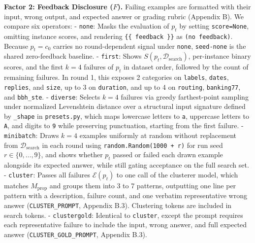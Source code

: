 \documentclass[10pt]{article}
\begin{document}
\textbf{Factor 2: Feedback Disclosure (\(F\)).} Failing examples are
formatted with their input, wrong output, and expected answer or grading
rubric (Appendix B). We compare six operators: - \texttt{none}: Masks
the evaluation of \(p_t\) by setting \texttt{score=None}, omitting
instance scores, and rendering \texttt{\{\{\ feedback\ \}\}} as
\texttt{(no\ feedback)}. Because \(p_t = c_0\) carries no
round-dependent signal under \texttt{none}, \texttt{seed-none} is the
shared zero-feedback baseline. - \texttt{first}: Shows
\(S(p_t, \mathcal{D}_{\text{search}})\), per-instance binary scores, and
the first \(k = 4\) failures of \(p_t\) in dataset order, followed by
the count of remaining failures. In round 1, this exposes 2 categories
on \texttt{labels}, \texttt{dates}, \texttt{replies}, and \texttt{size},
up to 3 on \texttt{duration}, and up to 4 on \texttt{routing},
\texttt{banking77}, and \texttt{bbh\_ste}. - \texttt{diverse}: Selects
\(k = 4\) failures via greedy farthest-point sampling under normalized
Levenshtein distance over a structural input signature defined by
\texttt{\_shape} in \texttt{presets.py}, which maps lowercase letters to
\texttt{a}, uppercase letters to \texttt{A}, and digits to \texttt{9}
while preserving punctuation, starting from the first failure. -
\texttt{minibatch}: Draws \(k = 4\) examples uniformly at random without
replacement from \(\mathcal{D}_{\text{search}}\) in each round using
\texttt{random.Random(1000\ +\ r)} for run seed
\(r \in \{0, \dots, 9\}\), and shows whether \(p_t\) passed or failed
each drawn example alongside its expected answer, while still gating
acceptance on the full search set. - \texttt{cluster}: Passes all
failures \(\mathcal{E}(p_t)\) to one call of the clusterer model, which
matches \(M_{\text{prop}}\) and groups them into 3 to 7 patterns,
outputting one line per pattern with a description, failure count, and
one verbatim representative wrong answer (\texttt{CLUSTER\_PROMPT},
Appendix B.3). Clustering tokens are included in search tokens. -
\texttt{clustergold}: Identical to \texttt{cluster}, except the prompt
requires each representative failure to include the input, wrong answer,
and full expected answer (\texttt{CLUSTER\_GOLD\_PROMPT}, Appendix B.3).
\end{document}
